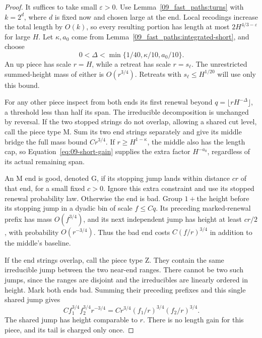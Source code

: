 \begin{proof}
It suffices to take small \(\varepsilon>0\).  Use
Lemma~\ref{09_fast_paths:turns} with \(k=2^d\), where \(d\) is
fixed now and chosen large at the end.  Local recodings increase the
total length by \(O(k)\), so every resulting portion has length at
most \(2H^{4/3-\varepsilon}\) for large \(H\).  Let
\(\kappa,a_0\) come from Lemma~\ref{09_fast_paths:integrated-short},
and choose
\[
           0<\Delta<\min\{1/40,\kappa/10,a_0/10\}.
\]
An up piece has scale \(r=H\), while a retreat has scale
\(r=s_\ell\).  The unrestricted summed-height mass of either is
\(O(r^{3/4})\).  Retreats with \(s_\ell\le H^{1/20}\) will use
only this bound.

For any other piece inspect from both ends its first renewal beyond
\(q=\lfloor rH^{-\Delta}\rfloor\), a threshold less than half
its span.  The irreducible decomposition is unchanged by reversal.
If the two stopped strings do not overlap, allowing a shared cut
level, call the piece type \(\mathrm M\).  Sum its two end strings
separately and give its middle bridge the full mass bound
\(Cr^{3/4}\).  If \(r\ge H^{1-\kappa}\), the middle also has
the length cap, so Equation~\eqref{eq:09-short-gain} supplies the
extra factor \(H^{-a_0}\), regardless of its actual remaining span.

An \(\mathrm M\) end is good, denoted \(\mathrm G\), if its
stopping jump lands within distance \(cr\) of that end, for a small
fixed \(c>0\).  Ignore this extra constraint and use its stopped
renewal probability law.  Otherwise the end is bad.  Group
\(1+\)the height before its stopping jump in a dyadic bin of scale
\(f\le Cq\).  Its preceding marked-renewal prefix has mass
\(O(f^{3/4})\), and its next independent jump has height at least
\(cr/2\), with probability \(O(r^{-3/4})\).  Thus the bad end
costs \(C(f/r)^{3/4}\) in addition to the middle's baseline.

If the end strings overlap, call the piece type \(\mathrm Z\).
They contain the same irreducible jump between the two near-end
ranges.  There cannot be two such jumps, since the ranges are
disjoint and the irreducibles are linearly ordered in height.  Mark
both ends bad.  Summing their preceding prefixes and this single
shared jump gives
\begin{equation}
 C f_1^{3/4}f_2^{3/4}r^{-3/4}
       =Cr^{3/4}(f_1/r)^{3/4}(f_2/r)^{3/4}.        \label{eq:09-overlap}
\end{equation}
The shared jump has height comparable to \(r\).  There is no
length gain for this piece, and its tail is charged only once.


\end{proof}

